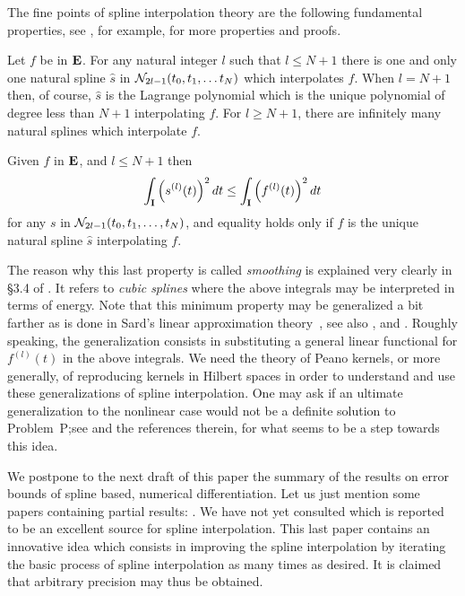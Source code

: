 The fine points of spline interpolation theory are the following
fundamental properties, see
\cite{schoenberg1964d,deboor1966,greville1969b}, for example, for more
properties and proofs.

Let $f$ be in ${\bf E}$.
For any natural integer $l$ such that $l \le N+1$ there is
one and only one natural spline $\hat s$ in ${\cal N}_{2l-1}(t_0, t_1, \ldots
t_N)$ which interpolates $f$.
When $l = N+1$ then, of course, $\hat s$ is the Lagrange polynomial which is
the unique polynomial of degree less than $N+1$ interpolating $f$.
For $l \ge N+1$, there are infinitely many natural splines which
interpolate $f$.

Given $f$ in ${\bf E}$, and $l \le N+1$ then
$$
\int_{\bf I} \left( s^{(l)}(t) \right)^2 dt \le
\int_{\bf I} \left( f^{(l)}(t) \right)^2 dt
$$
for any $s$ in ${\cal N}_{2l-1}(t_0, t_1, \ldots, t_N)$, and equality holds
only if $f$ is the unique natural spline $\hat s$ interpolating $f$.

The reason why this last property is called {\it smoothing} is
explained very clearly in \S 3.4 of \cite{nonweiler1984}. 
It refers to {\it cubic splines} where the above integrals may be
interpreted in terms of energy.
Note that this minimum property may be generalized a bit farther as is done
in Sard's linear approximation theory~\cite{sard1967}, see also
\cite{greville1969b}, and
\cite{micchelli1976c,micchelli1976a,micchelli1976b}.
Roughly speaking, the generalization consists in substituting a general
linear functional for $f^{(l)}(t)$ in the above integrals.
We need the theory of Peano kernels, or more generally, of reproducing
kernels in Hilbert spaces in order to understand and use these
generalizations of spline interpolation.
One may ask if an ultimate generalization to the nonlinear case would
not be a definite solution to Problem~P;see \cite{micchelli1976b} and
the references therein, for what
seems to be a step towards this idea. 

We postpone to the next draft of this paper the summary of the results
on error bounds of spline based, numerical differentiation.
Let us just mention some papers containing partial results:
\cite{golomb1959,varma0000,birkhoff1964,secrest1965,sard1967,greville1969b,dolezal1982}.
We have not yet consulted \cite{deboor1978b} which is reported to
be an excellent source for spline interpolation.
This last paper contains an
innovative idea which consists in improving the spline interpolation by
iterating the basic process of spline interpolation as many times as desired. 
It is claimed that arbitrary precision may
thus be obtained.

